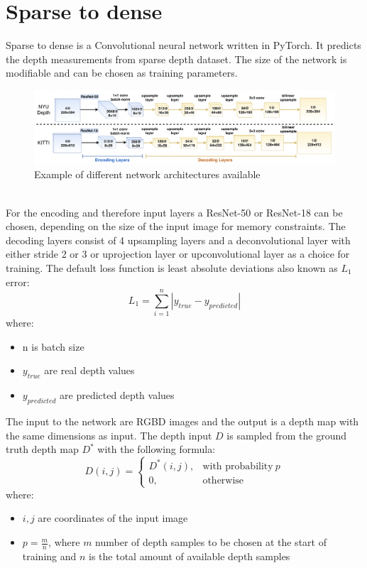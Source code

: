 \documentclass[twoside]{ctuthesis}
\theoremstyle{plain}
\theoremstyle{definition}
\theoremstyle{note}
\begin{document}
\section{Sparse to dense}
Sparse to dense is a Convolutional neural network written in PyTorch. It predicts the depth measurements from sparse depth dataset. The size of the network is modifiable and can be chosen as training parameters.
\begin{figure}[h!]
	\caption{Example of different network architectures available}
	\includegraphics[width=\textwidth]{sparse2dense.png}
	\centering
\end{figure}\\
For the encoding and therefore input layers a ResNet-50 or ResNet-18 can be chosen, depending on the size of the input image for memory constraints. The decoding layers consist of 4 upsampling layers and a deconvolutional layer with either stride 2 or 3 or uprojection layer or upconvolutional layer as a choice for training. The default loss function is least absolute deviations also known as $L_1$ error:
\begin{equation}
	L_1=\sum_{i=1}^{n}|y_{true}-y_{predicted}|
\end{equation}
where:
\begin{itemize}
	\item n is batch size
	\item $y_{true}$ are real depth values
	\item $y_{predicted}$ are predicted depth values
\end{itemize}
The input to the network are RGBD images and the output is a depth map with the same dimensions as input. The depth input $D$ is sampled from the ground truth depth map $D^*$ with the following formula:
\begin{equation}
	D(i,j)=\begin{cases}
		D^*(i,j),&\text{with probability}\ p\\
		0,&\text{otherwise}
	\end{cases}
\end{equation}
where:
\begin{itemize}
	\item $i,j$ are coordinates of the input image
	\item $p=\frac{m}{n}$, where $m$ number of depth samples to be chosen at the start of training and $n$ is the total amount of available depth samples
\end{itemize}
\end{document}
